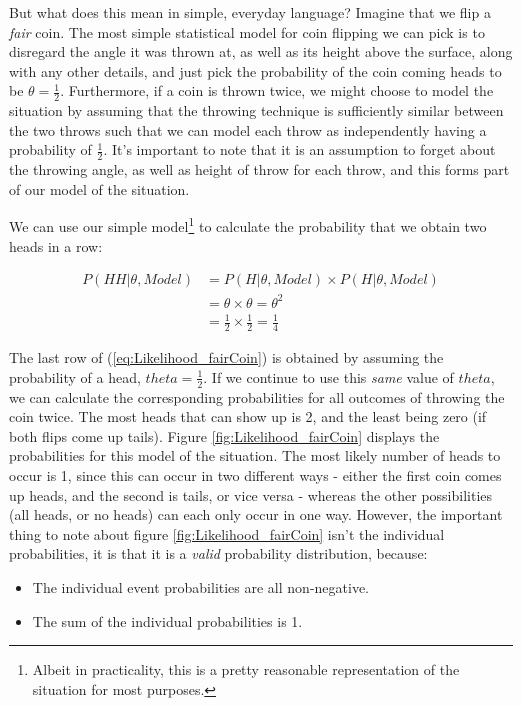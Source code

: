 \documentclass[11pt,fullpage]{book}
\begin{document}
But what does this mean in simple, everyday language? Imagine that we flip a \textit{fair} coin. The most simple statistical model for coin flipping we can pick is to disregard the angle it was thrown at, as well as its height above the surface, along with any other details, and just pick the probability of the coin coming heads to be $\theta=\frac{1}{2}$. Furthermore, if a coin is thrown twice, we might choose to model the situation by assuming that the throwing technique is sufficiently similar between the two throws such that we can model each throw as independently having a probability of $\frac{1}{2}$. It's important to note that it is an assumption to forget about the throwing angle, as well as height of throw for each throw, and this forms part of our model of the situation. 

We can use our simple model\footnote{Albeit in practicality, this is a pretty reasonable representation of the situation for most purposes.} to calculate the probability that we obtain two heads in a row:

\begin{equation}
\begin{align}
P(HH|\theta,Model) &= P(H|\theta,Model)\times P(H|\theta,Model)\\
&= \theta \times \theta = \theta^2\\ 
&= \frac{1}{2}\times \frac{1}{2} = \frac{1}{4}
\end{align}
\end{equation}\label{eq:Likelihood_fairCoin}

The last row of (\ref{eq:Likelihood_fairCoin}) is obtained by assuming the probability of a head, $theta=\frac{1}{2}$. If we continue to use this \textit{same} value of $theta$, we can calculate the corresponding probabilities for all outcomes of throwing the coin twice. The most heads that can show up is 2, and the least being zero (if both flips come up tails). Figure \ref{fig:Likelihood_fairCoin} displays the probabilities for this model of the situation. The most likely number of heads to occur is 1, since this can occur in two different ways - either the first coin comes up heads, and the second is tails, or vice versa - whereas the other possibilities (all heads, or no heads) can each only occur in one way. However, the important thing to note about figure \ref{fig:Likelihood_fairCoin} isn't the individual probabilities, it is that it is a \textit{valid} probability distribution, because:

\begin{itemize}
\item The individual event probabilities are all non-negative.
\item The sum of the individual probabilities is 1.
\end{itemize}
\end{document}
